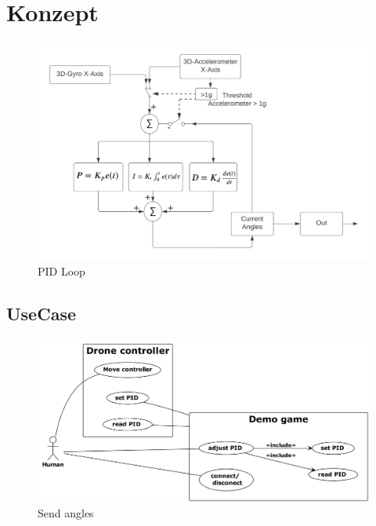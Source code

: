 \section{Konzept}

\begin{figure}[H]
  \begin{center}
    \includegraphics[width=1\linewidth]{content/images/PID_Loop.png}
    \caption{PID Loop}
  \end{center}
\end{figure}

\subsection{UseCase}
\begin{figure}[H]
  \begin{center}
    \includegraphics[width=0.9\linewidth]{content/diagrams/out/usecase/sendAngles.png}
    \caption{Send angles}
  \end{center}
\end{figure}

